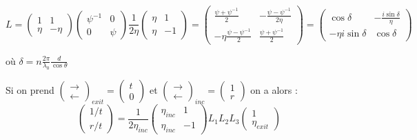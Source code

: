 \documentclass[a4paper,english]{article}
\begin{document}
\begin{dmath}
L = \begin{pmatrix} 1 & 1 \\ \eta & -\eta \end{pmatrix} \begin{pmatrix} \psi^{-1} & 0 \\ 0 & \psi \end{pmatrix} \frac{1}{2 \eta} \begin{pmatrix} \eta & 1 \\ \eta & -1 \end{pmatrix} = 
\begin{pmatrix} \frac{\psi + \psi^{-1}}{2} & -\frac{\psi - \psi^{-1}}{2\eta} \\ -\eta\frac{\psi - \psi^{-1}}{2} & \frac{\psi + \psi^{-1}}{2} \end{pmatrix} =
\begin{pmatrix} \cos \delta & -\frac{i \sin \delta}{\eta} \\ -\eta i \sin \delta & \cos \delta \end{pmatrix}
\end{dmath}

où $\delta = n \frac{2\pi}{\lambda_0} \frac{d}{\cos \theta}$

Si on prend $\begin{pmatrix}\rightarrow \\ \leftarrow\end{pmatrix}_{exit} = \begin{pmatrix}t \\ 0\end{pmatrix}$ et $\begin{pmatrix}\rightarrow \\ \leftarrow\end{pmatrix}_{inc} = \begin{pmatrix}1 \\ r\end{pmatrix}$ on a alors :
\begin{dmath}
\begin{pmatrix}1/t \\ r/t \end{pmatrix} = \frac{1}{2 \eta_{inc}} \begin{pmatrix} \eta_{inc} & 1 \\ \eta_{inc} & -1 \end{pmatrix} L_1 L_2 L_3 \begin{pmatrix} 1 \\ \eta_{exit} \end{pmatrix}
\end{dmath}
\end{document}
